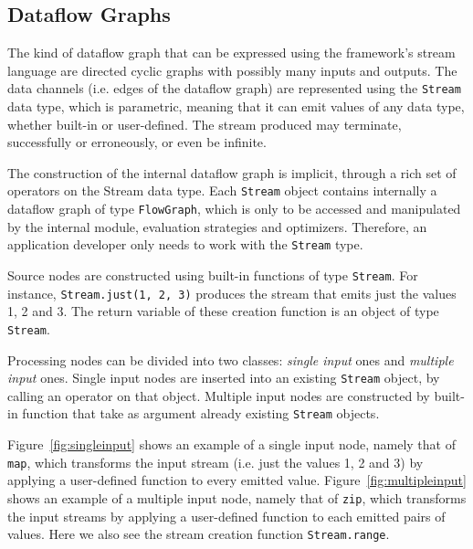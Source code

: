 \documentclass[sigplan,screen]{acmart}
\begin{document}
\subsection{Dataflow Graphs}

The kind of dataflow graph that can be expressed using the framework's stream
language are directed cyclic graphs with possibly many inputs and outputs.
%
The data channels (i.e. edges of the dataflow graph) are represented using the
\texttt{Stream} data type, which is parametric, meaning that it can emit values
of any data type, whether built-in or user-defined. The stream produced may
terminate, successfully or erroneously, or even be infinite.

The construction of the internal dataflow graph is implicit, through a
rich set of operators on the Stream data type. Each \texttt{Stream} object
contains internally a dataflow graph of type \texttt{FlowGraph}, which is only
to be accessed and manipulated by the internal module, evaluation strategies and
optimizers. Therefore, an application developer only needs to work with the
\texttt{Stream} type.

Source nodes are constructed using built-in functions of type \texttt{Stream}.
For instance, \texttt{Stream.just(1, 2, 3)} produces the stream that emits just
the values 1, 2 and 3. The return variable of these creation function is an
object of type \texttt{Stream}.

Processing nodes can be divided into two classes: \textit{single input} ones and
\textit{multiple input} ones.
%
Single input nodes are inserted into an existing \texttt{Stream} object, by
calling an operator on that object.
Multiple input nodes are constructed by built-in function that take as
argument already existing \texttt{Stream} objects.

%
%
Figure~\ref{fig:singleinput} shows an
example of a single input node, namely that of \texttt{map}, which transforms
the input stream (i.e. just the values 1, 2 and 3) by applying a user-defined
function to every emitted value.
%
Figure~\ref{fig:multipleinput} shows
an example of a multiple input node, namely that of \texttt{zip}, which
transforms the input streams by
applying a user-defined function to each emitted pairs of values.
Here we also see the stream creation function \texttt{Stream.range}.
%
\end{document}
